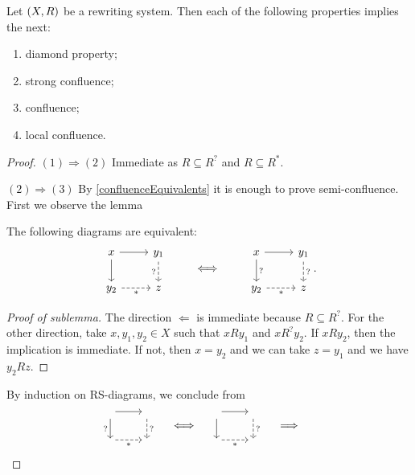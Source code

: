 \begin{lemma} \label{confluenceImplications}
Let $\left( X,R \right)$ be a rewriting system. Then each of the following properties implies the next:
\begin{enumerate}
\item diamond property;
\item strong confluence;
\item confluence;
\item local confluence.
\end{enumerate}
\end{lemma}
\begin{proof}
$(1) \Rightarrow (2)$ Immediate as $R \subseteq R^?$ and $R\subseteq R^*$.

$(2) \Rightarrow (3)$ By \ref{confluenceEquivalents} it is enough to prove semi-confluence. First we observe the lemma
\begin{lemma*} The following diagrams are equivalent:
\[ \begin{tikzcd}
x \arrow[r] \arrow[d, "{}"] & y_1 \arrow[d, dashed, swap, "{?}"] \\
y_2 \arrow[r, dashed, swap, "{*}"] & {z}
\end{tikzcd} \qquad\iff\qquad \begin{tikzcd}
x \arrow[r] \arrow[d, "{?}"] & y_1 \arrow[d, dashed, "{?}"] \\
y_2 \arrow[r, dashed, swap, "{*}"] & {z}
\end{tikzcd}. \]
\end{lemma*}
\begin{proof}[Proof of sublemma] \renewcommand{\qedsymbol}{$\dashv$}
The direction $\Leftarrow$ is immediate because $R\subseteq R^?$. For the other direction, take $x,y_1,y_2 \in X$ such that $xRy_1$ and $xR^?y_2$. If $xRy_2$, then the implication is immediate. If not, then $x=y_2$ and we can take $z = y_1$ and we have $y_2Rz$.
\end{proof}
By induction on RS-diagrams, we conclude from
\[ \begin{tikzcd}[ampersand replacement=\&]
{} \arrow[r] \arrow[d, swap, "{?}"] \& {} \arrow[d, dashed, "{?}"] \\
{} \arrow[r, swap, dashed, "{*}"] \& {}
\end{tikzcd} \quad\iff\quad \begin{tikzcd}[ampersand replacement=\&]
{} \arrow[r] \arrow[d] \& {} \arrow[d, dashed, "{?}"] \\
{} \arrow[r, swap, dashed, "{*}"] \& {}
\end{tikzcd} \quad\implies\quad \begin{tikzcd}[ampersand replacement=\&]

\end{tikzcd}\]
\end{proof}

